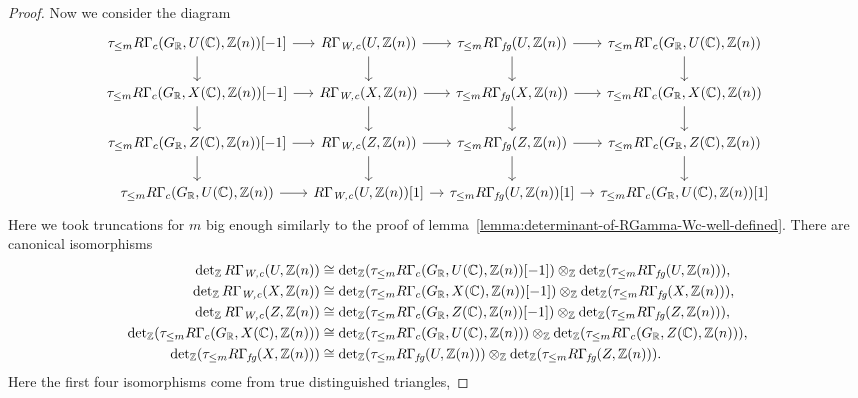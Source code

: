 \documentclass{article}
\numberwithin{equation}{section}
\begin{document}
\begin{lemma}
\begin{proof}
    Now we consider the diagram
    \[ \begin{tikzcd}[column sep=1em]
        \tau_{\le m} R\Gamma_c (G_\RR, U (\CC), \ZZ (n))[-1] \ar{r}\ar{d} & R\Gamma_\Wc (U, \ZZ (n))\ar{d}\ar{r} & \tau_{\le m} R\Gamma_\fg (U,\ZZ(n)) \ar{d}\ar{r} & \tau_{\le m} R\Gamma_c (G_\RR, U (\CC), \ZZ (n)) \ar{d} \\
        \tau_{\le m} R\Gamma_c (G_\RR, X (\CC), \ZZ (n))[-1] \ar{r}\ar{d} & R\Gamma_\Wc (X, \ZZ (n))\ar{d}\ar{r} & \tau_{\le m} R\Gamma_\fg (X,\ZZ(n)) \ar{d}\ar{r} & \tau_{\le m} R\Gamma_c (G_\RR, X (\CC), \ZZ (n)) \ar{d} \\
        \tau_{\le m} R\Gamma_c (G_\RR, Z (\CC), \ZZ (n))[-1] \ar{r}\ar{d} & R\Gamma_\Wc (Z, \ZZ (n))\ar{d}\ar{r} & \tau_{\le m} R\Gamma_\fg (Z,\ZZ(n)) \ar{d}\ar{r} & \tau_{\le m} R\Gamma_c (G_\RR, Z (\CC), \ZZ (n)) \ar{d} \\
        \tau_{\le m} R\Gamma_c (G_\RR, U (\CC), \ZZ (n)) \ar{r} & R\Gamma_\Wc (U, \ZZ (n)) [1] \ar{r} & \tau_{\le m} R\Gamma_\fg (U,\ZZ(n)) [1] \ar{r} & \tau_{\le m} R\Gamma_c (G_\RR, U (\CC), \ZZ (n)) [1]
      \end{tikzcd} \]
    Here we took truncations for $m$ big enough similarly to the proof of
    lemma~\ref{lemma:determinant-of-RGamma-Wc-well-defined}. There are
    canonical isomorphisms
    \begin{align*}
      \notag \operatorname{det}_{\mathbb{Z}} R\Gamma_{\text{\it W,c}} (U, \mathbb{Z}(n)) & \cong \operatorname{det}_{\mathbb{Z}} (\tau_{\le m} R\Gamma_c (G_{\mathbb{R}}, U (\mathbb{C}), \mathbb{Z} (n)) [-1]) \otimes_{\mathbb{Z}} \operatorname{det}_{\mathbb{Z}} (\tau_{\le m} R\Gamma_{\text{\it fg}} (U, \mathbb{Z}(n))), \\
      \notag \operatorname{det}_{\mathbb{Z}} R\Gamma_{\text{\it W,c}} (X, \mathbb{Z}(n)) & \cong \operatorname{det}_{\mathbb{Z}} (\tau_{\le m} R\Gamma_c (G_{\mathbb{R}}, X (\mathbb{C}), \mathbb{Z} (n)) [-1]) \otimes_{\mathbb{Z}} \operatorname{det}_{\mathbb{Z}} (\tau_{\le m} R\Gamma_{\text{\it fg}} (X, \mathbb{Z}(n))), \\
      \notag \operatorname{det}_{\mathbb{Z}} R\Gamma_{\text{\it W,c}} (Z, \mathbb{Z}(n)) & \cong \operatorname{det}_{\mathbb{Z}} (\tau_{\le m} R\Gamma_c (G_{\mathbb{R}}, Z (\mathbb{C}), \mathbb{Z} (n)) [-1]) \otimes_{\mathbb{Z}} \operatorname{det}_{\mathbb{Z}} (\tau_{\le m} R\Gamma_{\text{\it fg}} (Z, \mathbb{Z}(n))), \\
      \operatorname{det}_{\mathbb{Z}} (\tau_{\le m} R\Gamma_c (G_{\mathbb{R}}, X (\mathbb{C}), \mathbb{Z}(n))) & \cong \operatorname{det}_{\mathbb{Z}} (\tau_{\le m} R\Gamma_c (G_{\mathbb{R}}, U (\mathbb{C}), \mathbb{Z} (n))) \otimes_{\mathbb{Z}} \operatorname{det}_{\mathbb{Z}} (\tau_{\le m} R\Gamma_c (G_{\mathbb{R}}, Z (\mathbb{C}), \mathbb{Z}(n))), \\
      \operatorname{det}_{\mathbb{Z}} (\tau_{\le m} R\Gamma_{\text{\it fg}} (X, \mathbb{Z}(n))) & \cong \operatorname{det}_{\mathbb{Z}} (\tau_{\le m} R\Gamma_{\text{\it fg}} (U, \mathbb{Z} (n))) \otimes_{\mathbb{Z}} \operatorname{det}_{\mathbb{Z}} (\tau_{\le m} R\Gamma_{\text{\it fg}} (Z, \mathbb{Z}(n))).
    \end{align*}
    Here the first four isomorphisms come from true distinguished triangles,

\end{proof}
\end{lemma}
\end{document}
